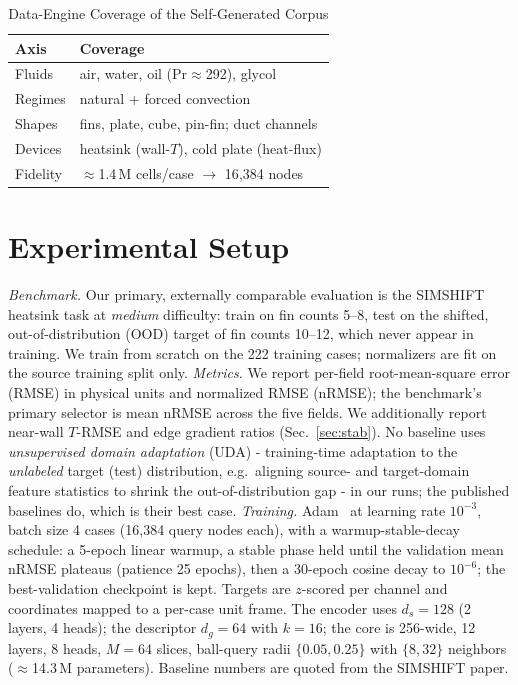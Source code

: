 \documentclass[conference]{IEEEtran}
\begin{document}
\begin{table}[t]\renewcommand{\arraystretch}{1.15}
\caption{Data-Engine Coverage of the Self-Generated Corpus}
\label{tab:corpus}\centering
\begin{tabular}{@{}ll@{}}\toprule
Axis & Coverage \\ \midrule
Fluids & air, water, oil (Pr$\approx$292), glycol \\
Regimes & natural + forced convection \\
Shapes & fins, plate, cube, pin-fin; duct channels \\
Devices & heatsink (wall-$T$), cold plate (heat-flux) \\
Fidelity & $\approx$1.4\,M cells/case $\rightarrow$ 16{,}384 nodes \\ \bottomrule
\end{tabular}
\end{table}

\section{Experimental Setup}
\textit{Benchmark.} Our primary, externally comparable evaluation is the SIMSHIFT~\cite{simshift}
heatsink task at \emph{medium} difficulty: train on fin counts 5--8, test on the shifted, out-of-distribution (OOD) target of fin
counts 10--12, which never appear in training. We train from scratch on the 222 training cases;
normalizers are fit on the source training split only. \textit{Metrics.} We report per-field root-mean-square error (RMSE) in
physical units and normalized RMSE (nRMSE); the benchmark's primary selector is mean nRMSE across the
five fields. We additionally report near-wall $T$-RMSE and edge gradient ratios (Sec.~\ref{sec:stab}).
No baseline uses \emph{unsupervised domain adaptation} (UDA) - training-time adaptation to the
\emph{unlabeled} target (test) distribution, e.g.\ aligning source- and target-domain feature
statistics to shrink the out-of-distribution gap - in our runs; the published baselines do, which
is their best case. \textit{Training.} Adam~\cite{adam} at learning rate $10^{-3}$, batch size 4 cases
(16{,}384 query nodes each), with a warmup-stable-decay schedule: a 5-epoch linear warmup, a stable
phase held until the validation mean nRMSE plateaus (patience 25 epochs), then a 30-epoch cosine decay
to $10^{-6}$; the best-validation checkpoint is kept. Targets are $z$-scored per channel and coordinates
mapped to a per-case unit frame. The encoder uses $d_s{=}128$ (2 layers, 4 heads); the descriptor
$d_g{=}64$ with $k{=}16$; the core is 256-wide, 12 layers, 8 heads, $M{=}64$ slices, ball-query radii
$\{0.05,0.25\}$ with $\{8,32\}$ neighbors ($\approx$14.3\,M parameters). Baseline numbers are quoted from
the SIMSHIFT paper.
\end{document}

